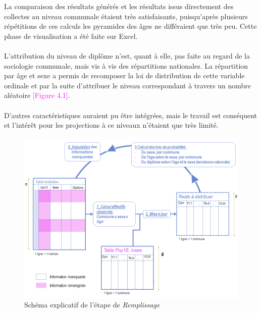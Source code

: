 \documentclass{bredele}
\begin{document}
La comparaison des résultats générés et les résultats issus directement des collectes au niveau communale étaient très satisfaisants, puisqu'après plusieurs répétitions de ces calculs les pyramides des âges ne différaient que très peu. Cette phase de visualisation a été faite sur Excel.\\\\
L'attribution du niveau de diplôme n'est, quant à elle, pas faite au regard de la sociologie communale, mais vis à vis des répartitions nationales. La répartition par âge et sexe a permis de recomposer la loi de distribution de cette variable ordinale et par la suite d'attribuer le niveau correspondant à travers un nombre aléatoire  \textcolor{magenta}{[Figure 4.1]}.\\\\
D'autres caractéristiques auraient pu être intégrées, mais le travail est conséquent et l'intérêt pour les projections à ce niveaux n'étaient que très limité.
 
\begin{figure}[!htb]\centering
\includegraphics[width=\textwidth]{PROCESSBDD_4}
\caption{Schéma explicatif de l'étape de \textit{Remplissage}}
\end{figure}
\newpage
\end{document}
